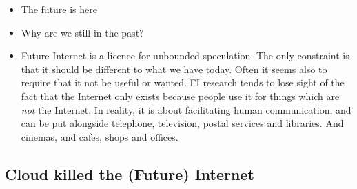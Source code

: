 \begin{itemize}
    \item The future is here
    
    \item Why are we still in the past?
     
    \item Future Internet is a licence for unbounded speculation.
    The only constraint is that it should be different to what we have today.
Often it seems also to require that it not be useful or wanted.
FI research tends to lose sight of the fact that the Internet only exists because people use it for things which are \textit{not} the Internet.
In reality, it is about facilitating human communication, and can be put alongside telephone, television, postal services and libraries.
And cinemas, and cafes, shops and offices.
\end{itemize}



\subsection{Cloud killed the (Future) Internet}

